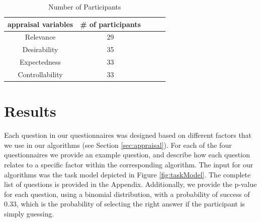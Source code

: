 \documentclass[12pt]{report}
\begin{document}
\begin{table}[htbp]
\centering
\caption{Number of Participants}
\begin{tabular}{|c|c|c|c|c|} \hline
appraisal variables & \# of participants\\ \hline 
Relevance &  29\\ \hline
Desirability & 35\\ \hline 
Expectedness & 33\\ \hline 
Controllability & 33\\ \hline
\end{tabular}
\label{tbl:statistics}
\end{table}

% 

\section{Results}
\label{sec:results-crowdsourcing}
Each question in our questionnaires was designed based on different factors that
we use in our algorithms (see Section \ref{sec:appraisal}).  For each of the
four questionnaires we provide an example question, and describe how each
question relates to a specific factor within the corresponding algorithm. The
input for our algorithms was the task model depicted in Figure
\ref{fig:taskModel}. The complete list of questions is provided in the Appendix.
Additionally, we provide the p-value for each question, using a binomial
distribution, with a probability of success of 0.33, which is the probability of
selecting the right answer if the participant is simply guessing.
\end{document}
